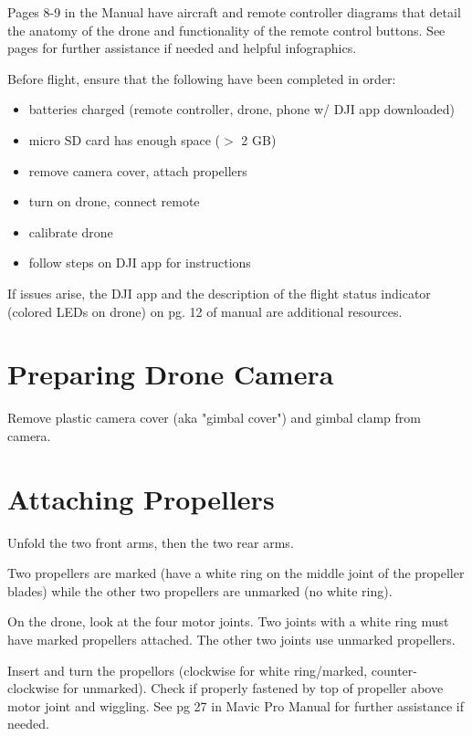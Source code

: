 \documentclass[12pt]{../SOP4_alpha}\usepackage[]{graphicx}\usepackage[]{color}
\begin{document}
\NP Pages 8-9 in the Manual have aircraft and remote controller diagrams that detail the anatomy of the drone and functionality of the remote control buttons. See pages for further assistance if needed and helpful infographics.

\NP Before flight, ensure that the following have been completed in order:
\begin{itemize}
  \item  batteries charged (remote controller, drone, phone w/ DJI app downloaded)
  \item  micro SD card has enough space ($ > $ 2 GB)
  \item  remove camera cover, attach propellers
  \item  turn on drone, connect remote
  \item  calibrate drone
  \item  follow steps on DJI app for instructions
\end{itemize}

\NP If issues arise, the DJI app and the description of the flight status indicator (colored LEDs on drone) on pg. 12 of manual are additional resources.


\section{Preparing Drone Camera}

\NP Remove plastic camera cover (aka "gimbal cover") and gimbal clamp from camera.


\section{Attaching Propellers}

\NP Unfold the two front arms, then the two rear arms. 

\NP Two propellers are marked (have a white ring on the middle joint of the propeller blades) while the other two propellers are unmarked (no white ring).

\NP On the drone, look at the four motor joints. Two joints with a white ring must have marked propellers attached. The other two joints use unmarked propellers.

\NP Insert and turn the propellors (clockwise for white ring/marked, counter-clockwise for unmarked). Check if properly fastened by top of propeller above motor joint and wiggling. See pg 27 in Mavic Pro Manual for further assistance if needed.
\end{document}
